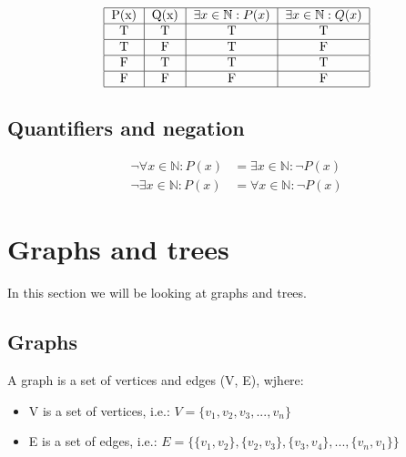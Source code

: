 \documentclass{article}
\begin{document}
\begin{align*}
    \begin{tabular}{|c|c|c|c|}
        \hline
        P(x) & Q(x) & $\exists x \in \mathbb{N} : P(x)$ & $\exists x \in \mathbb{N} : Q(x)$ \\
        \hline
        T    & T    & T                                 & T                                 \\
        \hline
        T    & F    & T                                 & F                                 \\
        \hline
        F    & T    & T                                 & T                                 \\
        \hline
        F    & F    & F                                 & F                                 \\
        \hline
    \end{tabular}
\end{align*}

\subsection{Quantifiers and negation}

\begin{align*}
    \neg \forall x \in \mathbb{N} : P(x) & = \exists x \in \mathbb{N} : \neg P(x) \\
    \neg \exists x \in \mathbb{N} : P(x) & = \forall x \in \mathbb{N} : \neg P(x)
\end{align*}




\section{Graphs and trees}

In this section we will be looking at graphs and trees.

\subsection{Graphs}

A graph is a set of vertices and edges (V, E), wjhere:

\begin{itemize}
    \item V is a set of vertices, i.e.: $V = \{v_1, v_2, v_3, ..., v_n\}$
    \item E is a set of edges, i.e.: $E = \{\{v_1, v_2\}, \{v_2, v_3\}, \{v_3, v_4\}, ..., \{v_n, v_1\}\}$
\end{itemize}
\end{document}
